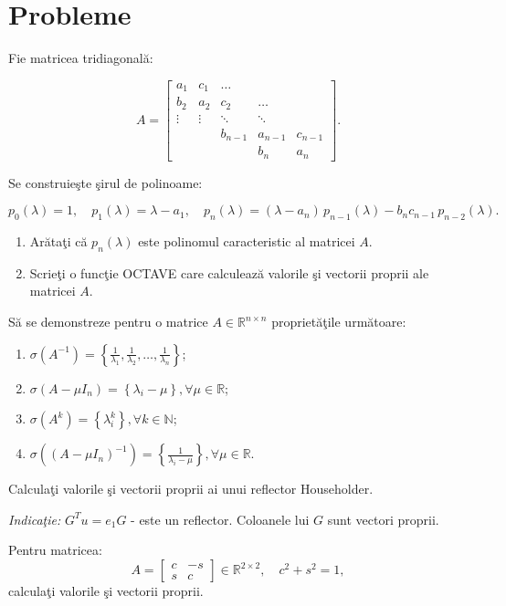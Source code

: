 \documentclass{exam}
\begin{document}
\section{Probleme}

\begin{questions}

	\question Fie matricea tridiagonală:

	\[
		A = \begin{bmatrix}
			a_1    & c_1    & \dots   &         &         \\
			b_2    & a_2    & c_2     & \dots   &         \\
			\vdots & \vdots & \ddots  & \ddots  &         \\
			       &        & b_{n-1} & a_{n-1} & c_{n-1} \\
			       &        &         & b_n     & a_n
		\end{bmatrix}.
	\]

	Se construieşte şirul de polinoame:

	\[
		p_0(\lambda) = 1,\quad
		p_1(\lambda) = \lambda - a_1,\quad
		p_n(\lambda) = (\lambda - a_n)\,p_{n-1}(\lambda) - b_n c_{n-1}\,p_{n-2}(\lambda).
	\]

	\begin{enumerate}
		\item Arătaţi că $p_{n}(\lambda)$ este polinomul caracteristic al matricei $A$.
		\item Scrieţi o funcţie OCTAVE care calculează valorile şi vectorii proprii ale matricei $A$.
	\end{enumerate}

	\question

	Să se demonstreze pentru o matrice $A \in \mathbb{R}^{n \times n}$ proprietăţile următoare:

	\begin{enumerate}
		\item $\sigma(A^{-1}) = \left\lbrace \tfrac{1}{\lambda _{1}}, \tfrac{1}{\lambda _{2}}, \ldots, \tfrac{1}{\lambda _{n}}\right\rbrace $;
		\item $\sigma(A - \mu I_{n}) = \left\lbrace \lambda_{i} - \mu \right\rbrace , \forall \mu \in \mathbb{R}$;
		\item $\sigma(A^{k}) = \left\lbrace \lambda_{i}^{k} \right\rbrace , \forall k \in \mathbb{N}$;
		\item $\sigma((A - \mu I_{n})^{- 1}) = \left\lbrace \tfrac{1}{\lambda_{i} - \mu} \right\rbrace , \forall \mu \in \mathbb{R}$.
	\end{enumerate}

	\question
	Calculaţi valorile şi vectorii proprii ai unui reflector Householder.

	\emph{Indicaţie:} $G^T u = e_1G$  - este un reflector. Coloanele lui $G$ sunt vectori proprii.

	\question
	Pentru matricea:
	\[
		A = \begin{bmatrix}
			c & -s \\
			s & c
		\end{bmatrix}
		\in \mathbb{R}^{2 \times 2}, \quad c^2 + s^2 = 1,
	\]
	calculaţi valorile şi vectorii proprii.
\end{questions}
\end{document}
